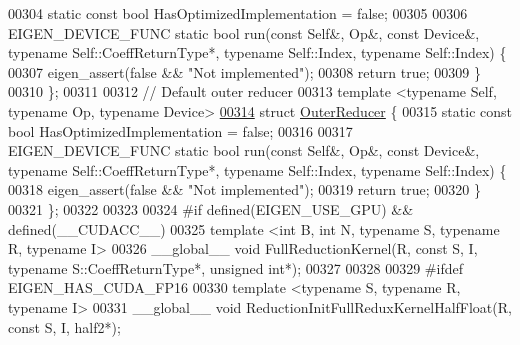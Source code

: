 \begin{DoxyCode}
00304   \textcolor{keyword}{static} \textcolor{keyword}{const} \textcolor{keywordtype}{bool} HasOptimizedImplementation = \textcolor{keyword}{false};
00305 
00306   EIGEN\_DEVICE\_FUNC \textcolor{keyword}{static} \textcolor{keywordtype}{bool} run(\textcolor{keyword}{const} Self&, Op&, \textcolor{keyword}{const} Device&, \textcolor{keyword}{typename} Self::CoeffReturnType*, \textcolor{keyword}{
      typename} Self::Index, \textcolor{keyword}{typename} Self::Index) \{
00307     eigen\_assert(\textcolor{keyword}{false} && \textcolor{stringliteral}{"Not implemented"});
00308     \textcolor{keywordflow}{return} \textcolor{keyword}{true};
00309   \}
00310 \};
00311 
00312 \textcolor{comment}{// Default outer reducer}
00313 \textcolor{keyword}{template} <\textcolor{keyword}{typename} Self, \textcolor{keyword}{typename} Op, \textcolor{keyword}{typename} Device>
\hyperlink{struct_eigen_1_1internal_1_1_outer_reducer}{00314} \textcolor{keyword}{struct }\hyperlink{struct_eigen_1_1internal_1_1_outer_reducer}{OuterReducer} \{
00315   \textcolor{keyword}{static} \textcolor{keyword}{const} \textcolor{keywordtype}{bool} HasOptimizedImplementation = \textcolor{keyword}{false};
00316 
00317   EIGEN\_DEVICE\_FUNC \textcolor{keyword}{static} \textcolor{keywordtype}{bool} run(\textcolor{keyword}{const} Self&, Op&, \textcolor{keyword}{const} Device&, \textcolor{keyword}{typename} Self::CoeffReturnType*, \textcolor{keyword}{
      typename} Self::Index, \textcolor{keyword}{typename} Self::Index) \{
00318     eigen\_assert(\textcolor{keyword}{false} && \textcolor{stringliteral}{"Not implemented"});
00319     \textcolor{keywordflow}{return} \textcolor{keyword}{true};
00320   \}
00321 \};
00322 
00323 
00324 \textcolor{preprocessor}{#if defined(EIGEN\_USE\_GPU) && defined(\_\_CUDACC\_\_)}
00325 \textcolor{keyword}{template} <\textcolor{keywordtype}{int} B, \textcolor{keywordtype}{int} N, \textcolor{keyword}{typename} S, \textcolor{keyword}{typename} R, \textcolor{keyword}{typename} I>
00326 \_\_global\_\_ \textcolor{keywordtype}{void} FullReductionKernel(R, \textcolor{keyword}{const} S, I, \textcolor{keyword}{typename} S::CoeffReturnType*, \textcolor{keywordtype}{unsigned} \textcolor{keywordtype}{int}*);
00327 
00328 
00329 \textcolor{preprocessor}{#ifdef EIGEN\_HAS\_CUDA\_FP16}
00330 \textcolor{keyword}{template} <\textcolor{keyword}{typename} S, \textcolor{keyword}{typename} R, \textcolor{keyword}{typename} I>
00331 \_\_global\_\_ \textcolor{keywordtype}{void} ReductionInitFullReduxKernelHalfFloat(R, \textcolor{keyword}{const} S, I, half2*);

\end{DoxyCode}
